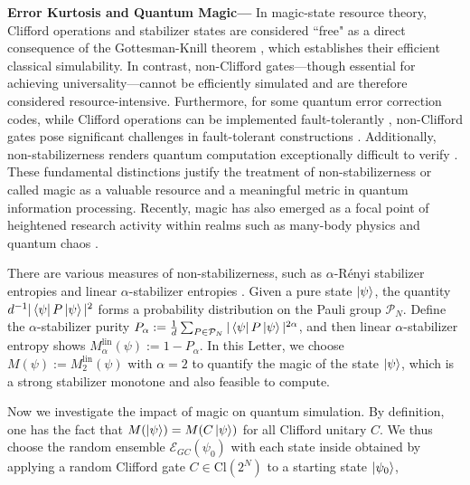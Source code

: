 \documentclass[showpacs,amsmath,amssymb,twocolumn,aps,pra,superscriptaddress,notitlepage,10pt]{revtex4-2}
\newcommand{\cP}{\mathcal P}
\newcommand{\cM}{\mathcal E_{GC}}
\begin{document}
\noindent\textbf{Error Kurtosis and Quantum Magic---} In magic-state resource theory, Clifford operations and stabilizer states are considered ``free" as a direct consequence of the Gottesman-Knill theorem \cite{gottesman1998heisenbergrepresentationquantumcomputers,PhysRevA.70.052328}, which establishes their efficient classical simulability. In contrast, non-Clifford gates—though essential for achieving universality—cannot be efficiently simulated and are therefore considered resource-intensive. Furthermore, for some quantum error correction codes, while Clifford operations can be implemented fault-tolerantly \cite{PhysRevLett.104.030503}, non-Clifford gates pose significant challenges in fault-tolerant constructions \cite{Kitaev2004computation,road2017,PhysRevLett.102.110502,bravyiMagicstateDistillationLow2012,PhysRevLett.118.090501,niroulaPhaseTransitionMagic2024,willsConstantoverheadMagicState2025}. Additionally, non-stabilizerness renders quantum computation exceptionally difficult to verify \cite{Jose2024GainingConfidencePRR}. These fundamental distinctions justify the treatment of non-stabilizerness or called magic as a valuable resource and a meaningful metric in quantum information processing. Recently, magic has also emerged as a focal point of heightened research activity within realms such as many-body physics \cite{liuManyBodyQuantumMagic2022,Chen2024magicofquantum,PRXQuantum.4.040317,turkeshiPauliSpectrumNonstabilizerness2025} and quantum chaos \cite{leoneQuantumChaosQuantum2021,Passarelli2025chaosmagicin,PhysRevD.106.126009}.

There are various measures of non-stabilizerness,
such as $\alpha$-R\'enyi stabilizer entropies and linear $\alpha$-stabilizer entropies \cite{leoneStabilizerRenyiEntropy2022,Haug_2023,leone2024stabilizer,dowlingMagicResourcesHeisenberg2025,lamiNonstabilizernessPerfectPauli2023,tarabungaNonstabilizernessMatrixProduct2024,li2025invested}. Given a pure state $\ket{\psi}$, the quantity $d^{-1}|\bra{\psi}P\ket{\psi}|^2$ forms a probability distribution on the Pauli group $\cP_N$. Define the $\alpha$-stabilizer purity $P_\alpha:=\frac{1}{d}\sum_{P\in \cP_N} |\bra{\psi}P\ket{\psi}|^{2\alpha}$, and then linear $\alpha$-stabilizer entropy shows $M^{\mathrm{lin}}_\alpha(\psi):=1-P_\alpha$. In this Letter, we choose $M(\psi):=M_2^{\mathrm{lin}}(\psi)$ with $\alpha=2$ to quantify the magic of the state $\ket{\psi}$, which is a strong stabilizer monotone \cite{leone2024stabilizer} and also feasible to compute.

Now we investigate the impact of magic on quantum simulation.
By definition, one has the fact that $M(\ket{\psi})=M(C\ket{\psi})$ for all Clifford unitary $C$.
We thus choose the random ensemble $\cM(\psi_0)$ with each state inside obtained by applying a random Clifford gate $C\in\mathrm{Cl}(2^N )$ to a starting state $\ket{\psi_0}$,
\end{document}
